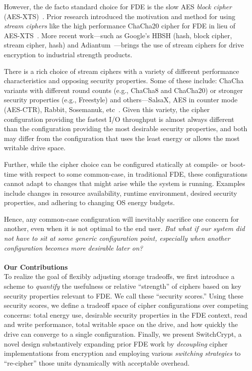 However, the de facto standard choice for FDE is the slow AES \emph{block
cipher} (AES-XTS)~\cite{AES, AES-XTS}. Prior research introduced the motivation
and method for using \emph{stream ciphers} like the high performance ChaCha20
cipher for FDE in lieu of AES-XTS~\cite{StrongBox, ChaCha20}. More recent
work---such as Google's HBSH (hash, block cipher, stream cipher, hash) and
Adiantum~\cite{HBSH, Adiantum}---brings the use of stream ciphers for drive
encryption to industrial strength products.

There is a rich choice of stream ciphers with a variety of different performance
characteristics and opposing security properties. Some of these include: ChaCha
variants with different round counts (e.g., ChaCha8 and ChaCha20) or stronger
security properties (e.g., Freestyle) and others---SalsaX, AES in counter mode
(AES-CTR), Rabbit, Sosemanuk, etc~\cite{Freestyle, SalsaX, Rabbit, Sosemanuk,
ChaCha20, AES-CTR}. Given this variety, the cipher configuration providing the
fastest I/O throughput is almost always different than the configuration
providing the most desirable security properties, and both may differ from the
configuration that uses the least energy or allows the most writable
drive space.

Further, while the cipher choice can be configured statically at compile- or
boot-time with respect to some common-case, in traditional FDE, these
configurations cannot adapt to changes that might arise while the system is
running. Examples include changes in resource availability, runtime environment,
desired security properties, and adhering to changing OS energy budgets.

Hence, any common-case configuration will inevitably sacrifice one concern for
another, even when it is not optimal to the end user. \emph{But what if our
system did not have to sit at some generic configuration point, especially when
another configuration becomes more desirable later on?}\\
\\
\textbf{Our Contributions}\\
To realize the goal of flexibly adjusting storage tradeoffs, we first introduce
a scheme to \emph{quantify} the usefulness or relative ``strength'' of ciphers
based on key security properties relevant to FDE. We call these ``security
scores.'' Using these security scores, we define a tradeoff space of cipher
configurations over competing concerns: total energy use, desirable security
properties in the FDE context, read and write performance, total writable space
on the drive, and how quickly the drive can converge to a single configuration.
Finally, we present SwitchCrypt, a novel design substantively expanding prior
FDE work by \emph{decoupling} cipher implementations from encryption and
employing various \emph{switching strategies} to ``re-cipher'' those units
dynamically with acceptable overhead.

